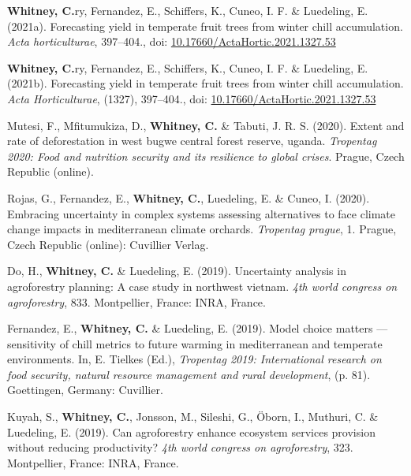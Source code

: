 \documentclass[11pt,a4paper,]{awesome-cv}
\newlength{\cslhangindent}
\newenvironment{CSLReferences}[2] %
 {\begin{list}{}{%
  \setlength{\itemindent}{0pt}
  \setlength{\leftmargin}{0pt}
  \setlength{\parsep}{0pt}
  \ifodd #1
   \setlength{\leftmargin}{\cslhangindent}
   \setlength{\itemindent}{-1\cslhangindent}
  \fi
  \setlength{\itemsep}{#2\baselineskip}}}
 {\end{list}}
\begin{document}
\begin{CSLReferences}{1}{0}
\textbf{Whitney, C.}ry, Fernandez, E., Schiffers, K., Cuneo, I. F. \&
Luedeling, E. (2021a). Forecasting yield in temperate fruit trees from
winter chill accumulation. \emph{Acta horticulturae}, 397--404., doi:
\href{https://doi.org/10.17660/ActaHortic.2021.1327.53}{10.17660/ActaHortic.2021.1327.53}

\textbf{Whitney, C.}ry, Fernandez, E., Schiffers, K., Cuneo, I. F. \&
Luedeling, E. (2021b). Forecasting yield in temperate fruit trees from
winter chill accumulation. \emph{Acta Horticulturae}, (1327), 397--404.,
doi:
\href{https://doi.org/10.17660/ActaHortic.2021.1327.53}{10.17660/ActaHortic.2021.1327.53}

Mutesi, F., Mfitumukiza, D., \textbf{Whitney, C.} \& Tabuti, J. R. S.
(2020). Extent and rate of deforestation in west bugwe central forest
reserve, uganda. \emph{Tropentag 2020: Food and nutrition security and
its resilience to global crises}. Prague, Czech Republic (online).

Rojas, G., Fernandez, E., \textbf{Whitney, C.}, Luedeling, E. \& Cuneo,
I. (2020). Embracing uncertainty in complex systems assessing
alternatives to face climate change impacts in mediterranean climate
orchards. \emph{Tropentag prague}, 1. Prague, Czech Republic (online):
Cuvillier Verlag.

Do, H., \textbf{Whitney, C.} \& Luedeling, E. (2019). Uncertainty
analysis in agroforestry planning: A case study in northwest vietnam.
\emph{4th world congress on agroforestry}, 833. Montpellier, France:
INRA, France.

Fernandez, E., \textbf{Whitney, C.} \& Luedeling, E. (2019). Model
choice matters --- sensitivity of chill metrics to future warming in
mediterranean and temperate environments. In, E. Tielkes (Ed.),
\emph{Tropentag 2019: International research on food security, natural
resource management and rural development}, (p. 81). Goettingen,
Germany: Cuvillier.

Kuyah, S., \textbf{Whitney, C.}, Jonsson, M., Sileshi, G., Öborn, I.,
Muthuri, C. \& Luedeling, E. (2019). Can agroforestry enhance ecosystem
services provision without reducing productivity? \emph{4th world
congress on agroforestry}, 323. Montpellier, France: INRA, France.


\end{CSLReferences}
\end{document}
